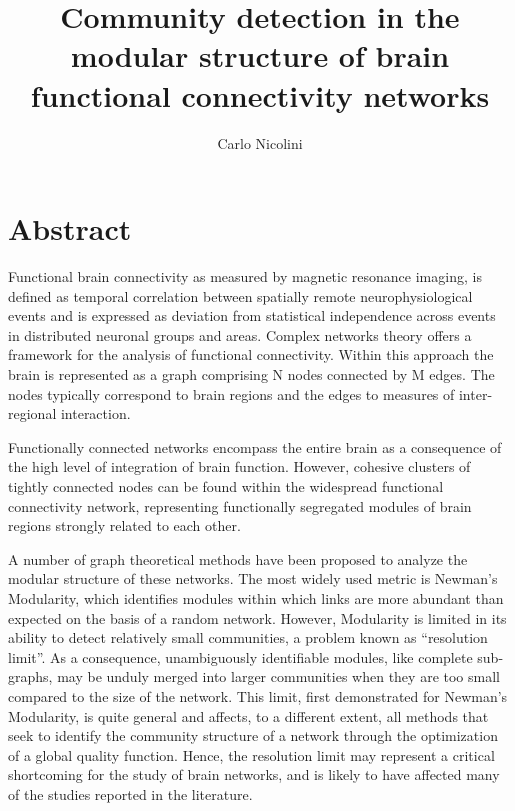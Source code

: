 \documentclass[11pt,              a4paper,              twoside,openright,              titlepage,              headinclude,footinclude,                            numbers=noenddot,              cleardoublepage=empty,]{scrreprt}
\title{Community detection in the modular structure of brain functional connectivity networks}
\author{Carlo Nicolini}
\begin{document}
 \maketitle
{}

\tableofcontents
\listoftodos





\chapter*{Abstract}
Functional brain connectivity as measured by magnetic resonance imaging, is defined as temporal correlation between spatially remote neurophysiological events and is expressed as deviation from statistical independence across events in distributed neuronal groups and areas.
Complex networks theory offers a framework for the analysis of functional connectivity.
Within this approach the brain is represented as a graph comprising N nodes connected by M edges.
The nodes typically correspond to brain regions and the edges to measures of inter-regional interaction.

Functionally connected networks encompass the entire brain as a consequence of the high level of integration of brain function.
However, cohesive clusters of tightly connected nodes can be found within the widespread functional connectivity network, representing functionally segregated modules of brain regions strongly related to each other.

A number of graph theoretical methods have been proposed to analyze the modular structure of these networks.
The most widely used metric is Newman's Modularity, which identifies modules within which links are more abundant than expected on the basis of a random network.
However, Modularity is limited in its ability to detect relatively small communities, a problem known as ``resolution limit''.
As a consequence, unambiguously identifiable modules, like complete sub-graphs, may be unduly merged into larger communities when they are too small compared to the size of the network.
This limit, first demonstrated for Newman's Modularity, is quite general and affects, to a different extent, all methods that seek to identify the community structure of a network through the optimization of a global quality function.
Hence, the resolution limit may represent a critical shortcoming for the study of brain networks, and is likely to have affected many of the studies reported in the literature.
\end{document}
